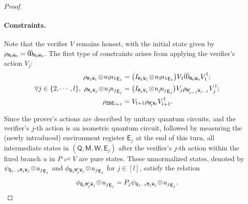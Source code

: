 \documentclass[10pt,a4paper]{article}
\numberwithin{equation}{section}
\numberwithin{figure}{section}
\newcommand{\protocol}[2]{{#1}\!\rightleftharpoons\!{#2}}
\let\ket\relax\DeclarePairedDelimiter\ket{\lvert}{\rangle}
\let\bra\relax\DeclarePairedDelimiter\bra{\langle}{\rvert}
\newcommand{\ketbra}[2]{\ensuremath{\ket{#1}\!\bra{#2}}}
\newcommand{\sfE}{\mathsf{E}}
\newcommand{\sfM}{\mathsf{M}}
\newcommand{\sfQ}{\mathsf{Q}}
\newcommand{\sfW}{\mathsf{W}}
\newcommand{\ttM}{\mathtt{M}}
\newcommand{\ttQ}{\mathtt{Q}}
\newcommand{\ttR}{\mathtt{R}}
\newcommand{\ttW}{\mathtt{W}}
\newcommand{\ttZ}{\mathtt{Z}}
\begin{document}
\begin{proof}
    \paragraph{Constraints.}
    Note that the verifier $V$ remains honest, with the initial state given by $\rho_{\ttM_0\ttW_0} = \ketbra{\bar{0}}{\bar{0}}_{\ttM_0\ttW_0}$.
    The first type of constraints arises from applying the verifier's action $V_j$:
    \begin{equation}
        \label{eq:QIPL-honest-verifier-cond}
        \begin{aligned}
            \rho_{\ttM_1\ttW_1} \!\otimes\! \ketbra{u_1}{u_1}_{\sfE_1} 
            &= \big( I_{\ttM_1\ttW_1}\!\otimes\!\ketbra{u_1}{u_1}_{\sfE_1}\big) V_1 \ketbra{\bar{0}}{\bar{0}}_{\ttM_0\ttW_0} V_1^{\dagger};\\
            \forall j \in \{2,\cdots,l\},~\rho_{\ttM_j\ttW_j} \!\otimes\! \ketbra{u_j}{u_j}_{\sfE_j} &= \big( I_{\ttM_j\ttW_j} \!\otimes\! \ketbra{u_j}{u_j}_{\sfE_j} \big) V_j \rho_{\ttM'_{j-1}\ttW_{j-1}} V_j^{\dagger};\\
            \rho_{\ttZ\ttR\sfE_{l+1}} &= V_{l+1} \rho_{\ttM'_l\ttW_l} V_{l+1}^{\dagger}.
        \end{aligned}
    \end{equation}

    Since the prover's actions are described by unitary quantum circuits, and the verifier's $j$-th action is an isometric quantum circuit, followed by measuring the (newly introduced) environment register $\sfE_j$ at the end of this turn, all intermediate states in $(\sfQ, \sfM, \sfW, \sfE_j)$ after the verifier's $j$-th action within the fixed branch $u$ in $\protocol{P}{V}$ are pure states.
    These unnormalized states, denoted by $\ket{\psi}_{\ttQ_{j-1}\ttM_j\ttW_j} \!\otimes\! \ket{u_j}_{\sfE_j}$ and $\ket{\phi}_{\ttQ_{j}\ttM'_j\ttW_j} \!\otimes\! \ket{u_j}_{\sfE_j}$ for $j \in [l]$, satisfy the relation
    \begin{equation}
        \label{eq:prover-action}
        \ket{\phi}_{\ttQ_{j}\ttM'_j\ttW_j} \!\otimes\! \ket{u_j}_{\sfE_j} = P_j \ket{\psi}_{\ttQ_{j-1}\ttM_j\ttW_j} \!\otimes\! \ket{u_j}_{\sfE_j}.
    \end{equation}
    

\end{proof}
\end{document}
